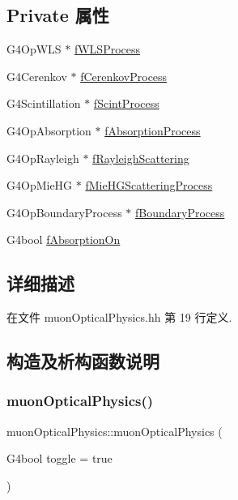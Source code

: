 \subsection*{Private 属性}
\begin{DoxyCompactItemize}
\item 
G4\+Op\+W\+LS $\ast$ \hyperlink{classmuonOpticalPhysics_a603344b48b23200e5a3f69676241abb4}{f\+W\+L\+S\+Process}
\item 
G4\+Cerenkov $\ast$ \hyperlink{classmuonOpticalPhysics_af1abe549a2e56ff6591dadaac8f8ce61}{f\+Cerenkov\+Process}
\item 
G4\+Scintillation $\ast$ \hyperlink{classmuonOpticalPhysics_ad8705ae7d4e3f1366523ccc73a78f93b}{f\+Scint\+Process}
\item 
G4\+Op\+Absorption $\ast$ \hyperlink{classmuonOpticalPhysics_a712a36a8a21a3bd287a74eb1ebc6859b}{f\+Absorption\+Process}
\item 
G4\+Op\+Rayleigh $\ast$ \hyperlink{classmuonOpticalPhysics_aeff581fd53988665009bd72f44884fe1}{f\+Rayleigh\+Scattering}
\item 
G4\+Op\+Mie\+HG $\ast$ \hyperlink{classmuonOpticalPhysics_a1887838798911c1cac32ce52737bc7a2}{f\+Mie\+H\+G\+Scattering\+Process}
\item 
G4\+Op\+Boundary\+Process $\ast$ \hyperlink{classmuonOpticalPhysics_ad1ae5e4a5cc1de805f33a1e3f191d1fa}{f\+Boundary\+Process}
\item 
G4bool \hyperlink{classmuonOpticalPhysics_a30f5b309ac9202d918e1b070a1a1f114}{f\+Absorption\+On}
\end{DoxyCompactItemize}


\subsection{详细描述}


在文件 muon\+Optical\+Physics.\+hh 第 19 行定义.



\subsection{构造及析构函数说明}
\mbox{\label{classmuonOpticalPhysics_a52eeca699e5ceef8bbf6b7e6aa2911d8}} 
\subsubsection{\texorpdfstring{muon\+Optical\+Physics()}{muonOpticalPhysics()}}
{\footnotesize\ttfamily muon\+Optical\+Physics\+::muon\+Optical\+Physics (\begin{DoxyParamCaption}\item[{G4bool}]{toggle = {\ttfamily true} }\end{DoxyParamCaption})}



